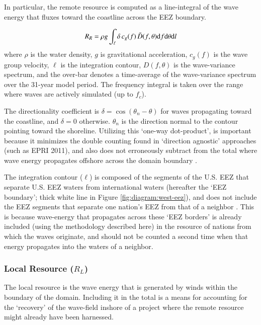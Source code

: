 In particular, the remote resource is computed as a line-integral of the wave energy that fluxes toward the coastline across the EEZ boundary.

\begin{align}
  R_R = \rho g \int_{\ell}\relax \delta \, c_g(f) \, \bar{D}(f,\theta) \mathrm{d} f \mathrm{d} \theta \mathrm{d} l
\label{eqn:RR}
\end{align}
where $\rho$ is the water density, $g$ is gravitational acceleration, $c_g(f)$ is the wave group velocity, $\ell$ is the integration contour, $D \left(f,\theta\right)$ is the wave-variance spectrum, and
the over-bar denotes a time-average of the wave-variance spectrum over the 31-year model period. The frequency integral is taken over the range where waves are actively simulated (up to $f_{c}$).

The directionality coefficient is $\delta = \cos(\theta_n - \theta)$ for waves propagating toward the coastline, and $\delta = 0$ otherwise.  $\theta_n$ is the direction normal to the contour pointing toward the shoreline. Utilizing this `one-way dot-product', is important because it minimizes the double counting found in `direction agnostic' approaches (such as EPRI 2011), and also does not erroneously subtract from the total where wave energy propagates offshore across the domain boundary \citep{nationalresearchcouncilEvaluationDepartmentEnergy2013,gunnQuantifyingGlobalWave2012}.

The integration contour ($\ell$) is composed of the segments of the U.S. EEZ that separate U.S. EEZ waters from international waters (hereafter the `EEZ boundary'; thick white line in Figure \ref{fig:diagram:west-eez}), and does not include the EEZ segments that separate one nation's EEZ from that of a neighbor \citep[]{flandersmarineinstituteMaritimeBoundariesGeodatabase2018}. This is because wave-energy that propagates across these `EEZ borders' is already included (using the methodology described here) in the resource of nations from which the waves originate, and should not be counted a second time when that energy propagates into the waters of a neighbor.

\subsubsection{Local Resource ($R_{L}$)} \label{sec:method:calc:local}
   
The local resource is the wave energy that is generated by winds within the boundary of the domain. Including it in the total is a means for accounting for the `recovery' of the wave-field inshore of a project where the remote resource might already have been harnessed.


